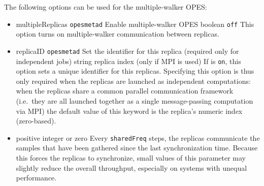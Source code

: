 
The following options can be used for the multiple-walker OPES:
\begin{itemize}
\item %
  \keydef
    {multipleReplicas}{%
    \texttt{opes{\textunderscore}metad}}{%
    Enable multiple-walker OPES}{%
    boolean}{%
    \texttt{off}}{%
    This option turns on multiple-walker communication between replicas.}
\item %
  \keydef
    {replicaID}{%
    \texttt{opes{\textunderscore}metad}}{%
    Set the identifier for this replica (required only for independent jobs)}{%
    string}{%
    replica index (only if MPI is used)}{%
    If  is \texttt{on}, this option sets a unique identifier for this replicas.
    Specifying this option is thus only required when the replicas are launched as independent computations:
    when the replicas share a common parallel communication framework (i.e.\ they are all launched together as a single message-passing computation via MPI) the default value of this keyword is the replica's numeric index (zero-based).
}
\item
  {positive integer or zero}
  {}
  {
    Every \texttt{sharedFreq} steps, the replicas communicate the samples that have been gathered since the last synchronization time.
    Because this forces the replicas to synchronize, small values of this parameter may slightly reduce the overall throughput, especially on systems with unequal performance.
  }
\end{itemize}


